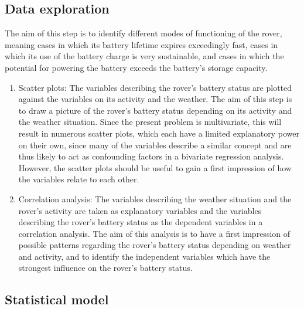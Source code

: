 \documentclass[11pt, UKenglish]{report}
\begin{document}
{\subsection*{Data exploration}

The aim of this step is to identify different modes of functioning of the rover, meaning cases in which its battery lifetime expires exceedingly fast, cases in which its use of the battery charge is very sustainable, and cases in which the potential for powering the battery exceeds the battery's storage capacity. 

\begin{enumerate}

	\item{\large{Scatter plots:} \normalsize The variables describing the rover's battery status are plotted against the variables on its activity and the weather. The aim of this step is to draw a picture of the rover's battery status depending on its activity and the weather situation. Since the present problem is multivariate, this will result in numerous scatter plots, which each have a limited explanatory power on their own, since many of the variables describe a similar concept and are thus likely to act as confounding factors in a bivariate regression analysis. However, the scatter plots should be useful to gain a first impression of how the variables relate to each other.}

	\item{\large{Correlation analysis:} \normalsize The variables describing the weather situation and the rover's activity are taken as explanatory variables and the variables describing the rover's battery status as the dependent variables in a correlation analysis. The aim of this analysis is to have a first impression of possible patterns regarding the rover's battery status depending on weather and activity, and to identify the independent variables which have the strongest influence on the rover's battery status.}

\end{enumerate}

\subsection*{Statistical model}

}
\end{document}
